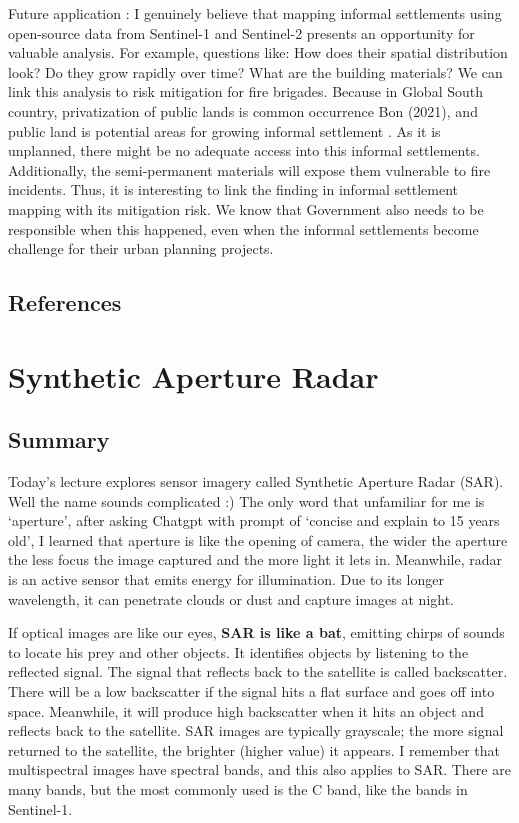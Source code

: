 \documentclass[
  letterpaper,
  DIV=11,
  numbers=noendperiod]{scrreprt}
\begin{document}
Future application : I genuinely believe that mapping informal
settlements using open-source data from Sentinel-1 and Sentinel-2
presents an opportunity for valuable analysis. For example, questions
like: How does their spatial distribution look? Do they grow rapidly
over time? What are the building materials? We can link this analysis to
risk mitigation for fire brigades. Because in Global South country,
privatization of public lands is common occurrence Bon (2021), and
public land is potential areas for growing informal settlement . As it
is unplanned, there might be no adequate access into this informal
settlements. Additionally, the semi-permanent materials will expose them
vulnerable to fire incidents. Thus, it is interesting to link the
finding in informal settlement mapping with its mitigation risk. We know
that Government also needs to be responsible when this happened, even
when the informal settlements become challenge for their urban planning
projects.

\hypertarget{references-5}{%
\section{References}\label{references-5}}


\hypertarget{synthetic-aperture-radar}{%
\chapter{Synthetic Aperture Radar}\label{synthetic-aperture-radar}}

\hypertarget{summary-7}{%
\section{Summary}\label{summary-7}}

Today's lecture explores sensor imagery called Synthetic Aperture Radar
(SAR). Well the name sounds complicated :) The only word that unfamiliar
for me is `aperture', after asking Chatgpt with prompt of `concise and
explain to 15 years old', I learned that aperture is like the opening of
camera, the wider the aperture the less focus the image captured and the
more light it lets in. Meanwhile, radar is an active sensor that emits
energy for illumination. Due to its longer wavelength, it can penetrate
clouds or dust and capture images at night.

If optical images are like our eyes, \textbf{SAR is like a bat},
emitting chirps of sounds to locate his prey and other objects. It
identifies objects by listening to the reflected signal. The signal that
reflects back to the satellite is called backscatter. There will be a
low backscatter if the signal hits a flat surface and goes off into
space. Meanwhile, it will produce high backscatter when it hits an
object and reflects back to the satellite. SAR images are typically
grayscale; the more signal returned to the satellite, the brighter
(higher value) it appears. I remember that multispectral images have
spectral bands, and this also applies to SAR. There are many bands, but
the most commonly used is the C band, like the bands in Sentinel-1.
\end{document}
